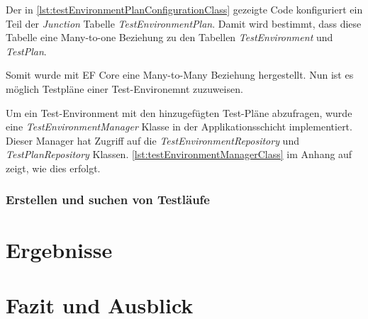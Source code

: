 \documentclass[a4paper, fontsize=11pt, parskip=half, twoside]{scrreprt}
\begin{document}
	Der in \autoref{lst:testEnvironmentPlanConfigurationClass} gezeigte Code konfiguriert ein Teil der \emph{Junction} Tabelle \emph{TestEnvironmentPlan}.
	Damit wird bestimmt, dass diese Tabelle eine Many-to-one Beziehung zu den Tabellen \emph{TestEnvironment} und \emph{TestPlan}.
	
	Somit wurde mit \ac{EF} Core eine Many-to-Many Beziehung hergestellt. 
	Nun ist es möglich Testpläne einer Test-Environemnt zuzuweisen.
	
	Um ein Test-Environment mit den hinzugefügten Test-Pläne abzufragen, wurde eine \emph{TestEnvironmentManager} Klasse in der Applikationsschicht implementiert.
	Dieser Manager hat Zugriff auf die \emph{TestEnvironmentRepository} und \emph{TestPlanRepository} Klassen.
	\autoref{lst:testEnvironmentManagerClass} im Anhang auf  zeigt, wie dies erfolgt.
	
	\subsection{Erstellen und suchen von Testläufe} \label{subsec:createAndSearchTestruns}
	
	
	
	\chapter{Ergebnisse}
	
	
	
	\chapter{Fazit und Ausblick}
	
	
	\clearpage
	\printbibliography
	
\end{document}
